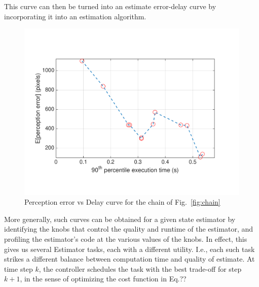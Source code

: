 This curve can then be turned into an estimate error-delay curve by incorporating it into an estimation algorithm.
\begin{figure}[t]
	\centering
	\includegraphics[width=0.9\columnwidth]{figures/chainErrorDelay}
	\caption{Perception error vs Delay curve for the chain of Fig.~\ref{fig:chain}}
	\label{fig:chainErrorDelay}
\end{figure}
More generally, such curves can be obtained for a given state estimator by identifying the knobs that control the quality and runtime of the estimator, and profiling the estimator's code at the various values of the knobs.
In effect, this gives us several Estimator tasks, each with a different utility.
I.e., each such task strikes a different balance between computation time and quality of estimate.
At time step $k$, the controller schedules the task with the best trade-off for step $k+1$, in the sense of optimizing the cost function in Eq.??

